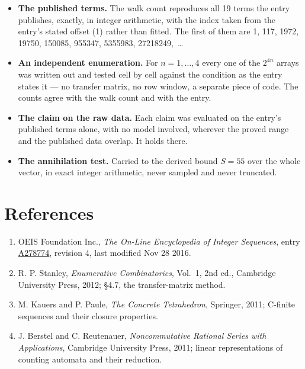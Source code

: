 \documentclass[11pt]{article}
\theoremstyle{definition}
\begin{document}
\begin{itemize}

\item {\bfseries The published terms.} The walk count reproduces all 19 terms the entry publishes, exactly, in integer arithmetic, with the index taken from the entry's stated offset (1) rather than fitted. The first of them are 1, 117, 1972, 19750, 150085, 955347, 5355983, 27218249,~\dots

\item {\bfseries An independent enumeration.} For $n = 1,\dots,4$ every one of the $2^{4n}$ arrays was written out and tested cell by cell against the condition as the entry states it --- no transfer matrix, no row window, a separate piece of code. The counts agree with the walk count and with the entry.

\item {\bfseries The claim on the raw data.} Each claim was evaluated on the entry's published terms alone, with no model involved, wherever the proved range and the published data overlap. It holds there.

\item {\bfseries The annihilation test.} Carried to the derived bound $S = 55$ over the whole vector, in exact integer arithmetic, never sampled and never truncated.

\end{itemize}

\section{References}

\begin{enumerate}

\item OEIS Foundation Inc., \emph{The On-Line Encyclopedia of Integer Sequences}, entry \href{https://oeis.org/A278774}{A278774}, revision 4, last modified Nov 28 2016.

\item R. P. Stanley, \emph{Enumerative Combinatorics}, Vol.~1, 2nd ed., Cambridge University Press, 2012; \S4.7, the transfer-matrix method.

\item M. Kauers and P. Paule, \emph{The Concrete Tetrahedron}, Springer, 2011; C-finite sequences and their closure properties.

\item J. Berstel and C. Reutenauer, \emph{Noncommutative Rational Series with Applications}, Cambridge University Press, 2011; linear representations of counting automata and their reduction.

\end{enumerate}
\end{document}
